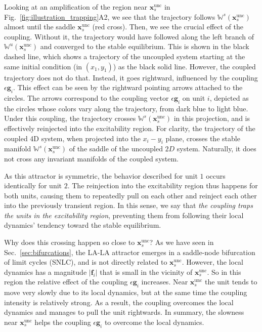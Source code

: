 Looking at an amplification of the region near $\mathbf{x}_s^\mathrm{unc}$ in Fig.~\ref{fig:illustration_trapping}A2, we see that the trajectory follows $\mathbb{W}^s(\mathbf{x}_s^\mathrm{unc})$ almost until the saddle $\mathbf{x}_s^\mathrm{unc}$ (red cross). Then, we see the crucial effect of the coupling. Without it, the trajectory would have followed along the left branch of $\mathbb{W}^u(\mathbf{x}_s^\mathrm{unc})$ and converged to the stable equilibrium. This is shown in the black dashed line, which shows a trajectory of the uncoupled system starting at the same initial condition (in $(x_1, y_1)$) as the black solid line. However, the coupled trajectory does not do that. Instead, it goes rightward, influenced by the coupling $\epsilon \mathbf{g}_i$. This effect can be seen by the rightward pointing arrows attached to the circles. The arrows correspond to the coupling vector $\epsilon \mathbf{g}_i$ on unit $i$, depicted as the circles whose colors vary along the trajectory, from dark blue to light blue. Under this coupling, the trajectory crosses $\mathbb{W}^s(\mathbf{x}_s^\mathrm{unc})$ in this projection, and is effectively reinjected into the excitability region.  For clarity, the trajectory of the coupled 4D system, when projected into the $x_i-y_i$ plane, crosses the stable manifold $\mathbb{W}^s(\mathbf{x}_s^\mathrm{unc})$ of the saddle of the uncoupled $2D$ system. Naturally, it does not cross any invariant manifolds of the coupled system.

As this attractor is symmetric, the behavior described for unit $1$ occurs identically for unit $2$. The reinjection into the excitability region thus happens for both units, causing them to repeatedly pull on each other and reinject each other into the previously transient region. In this sense, we say that \textit{the coupling traps the units in the excitability region}, preventing them from following their local dynamics' tendency toward the stable equilibrium.

Why does this crossing happen so close to $\mathbf{x}_s^\mathrm{unc}$? As we have seen in Sec.~\ref{sec:bifurcations}, the LA-LA attractor emerges in a saddle-node bifurcation of limit cycles (SNLC), and is not directly related to $\mathbf{x}_s^\mathrm{unc}$. However, the local dynamics has a magnitude $|\mathbf{f}_i|$ that is small in the vicinity of $\mathbf{x}_s^\mathrm{unc}$. So in this region the relative effect of the coupling $\epsilon \mathbf{g}_i$ increases. Near $\mathbf{x}_s^\mathrm{unc}$ the unit tends to move very slowly due to its local dynamics, but at the same time the coupling intensity is relatively strong. As a result, the coupling overcomes the local dynamics and manages to pull the unit rightwards. In summary, the slowness near $\mathbf{x}_s^\mathrm{unc}$ helps the coupling $\epsilon \mathbf{g}_i$ to overcome the local dynamics. %

